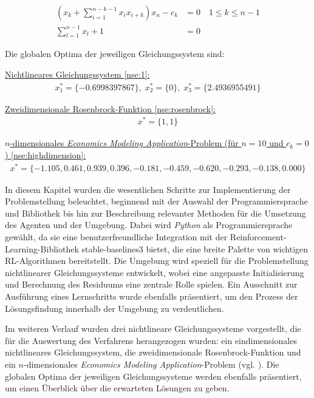 \documentclass{article}
\theoremstyle{newline}
\begin{document}
\begin{onehalfspace}
\begin{subequations}\label{nse:highdimension}
	\begin{align}
		\left( x_k + \sum_{i=1}^{n-k-1} x_i x_{i+k} \right) x_n - c_k &=0 \quad 1 \leq k \leq n-1\\
		\sum_{l=1}^{n-1} x_l + 1 &= 0
	\end{align}
\end{subequations}
\medskip

Die globalen Optima der jeweiligen Gleichungssystem sind:

\underline{Nichtlineares Gleichungssystem \ref{nse:1}:}
\vspace{-0.2cm}
\begin{align*}
	x^{\ast}_1 = \{-0.6998397867\},\; x^{\ast}_2 = \{0\},\; x^{\ast}_3 = \{2.4936955491\}
\end{align*}

\underline{Zweidimensionale Rosenbrock-Funktion \ref{nse:rosenbrock}:}
\vspace{-0.2cm}
\begin{align*}
	x^{\ast} = \{1, 1\}
\end{align*}

\underline{$n$-dimensionales \textit{Economics Modeling Application}-Problem (für $n=10$ und $c_k = 0$) \ref{nse:highdimension}:}
\vspace{-0.2cm}
\begin{align*}
	x^{\ast} = \{-1.105, 0.461, 0.939, 0.396, -0.181, -0.459, -0.620, -0.293, -0.138, 0.000\}
\end{align*}

In diesem Kapitel wurden die wesentlichen Schritte zur Implementierung der Problemstellung beleuchtet, beginnend mit der Auswahl der Programmiersprache und Bibliothek bis hin zur Beschreibung relevanter Methoden für die Umsetzung des Agenten und der Umgebung. Dabei wird \textit{Python} als Programmiersprache gewählt, da sie eine benutzerfreundliche Integration mit der Reinforcement-Learning-Bibliothek \glqq stable-baselines3\grqq{} bietet, die eine breite Palette von wichtigen RL-Algorithmen bereitstellt. Die Umgebung wird speziell für die Problemstellung nichtlinearer Gleichungssysteme entwickelt, wobei eine angepasste Initialisierung und Berechnung des Residuums eine zentrale Rolle spielen. Ein Ausschnitt zur Ausführung eines Lernschritts wurde ebenfalls präsentiert, um den Prozess der Lösungsfindung innerhalb der Umgebung zu verdeutlichen.

Im weiteren Verlauf wurden drei nichtlineare Gleichungssysteme vorgestellt, die für die Auswertung des Verfahrens herangezogen wurden: ein eindimensionales nichtlineares Gleichungssystem, die zweidimensionale Rosenbrock-Funktion und ein $n$-dimensionales \textit{Economics Modeling Application}-Problem (vgl. \cite{CrinaGrosan2008}). Die globalen Optima der jeweiligen Gleichungssysteme werden ebenfalls präsentiert, um einen Überblick über die erwarteten Lösungen zu geben.


\end{onehalfspace}
\end{document}
